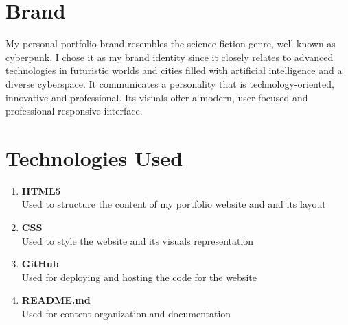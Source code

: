 \documentclass[12pt,a4paper,oneside]{report}
\begin{document}
\section{Brand}
My personal portfolio brand resembles the science fiction genre, well known as cyberpunk. I chose it as my brand identity since it closely relates to advanced technologies in futuristic worlds and cities filled with artificial intelligence and a diverse cyberspace. It communicates a personality that is technology-oriented, innovative and professional. Its visuals offer a modern, user-focused and professional responsive interface.


\newpage
\section{Technologies Used} 
\begin{enumerate}
    \item \textbf{HTML5}\\
    Used to structure the content of my portfolio website and and its layout

    \item \textbf{CSS}\\
    Used to style the website and its visuals representation

    \item \textbf{GitHub}\\
    Used for deploying and hosting the code for the website 

    \item \textbf{README.md}\\
    Used for content organization and documentation 
    
    \end{enumerate}

\end{document}
